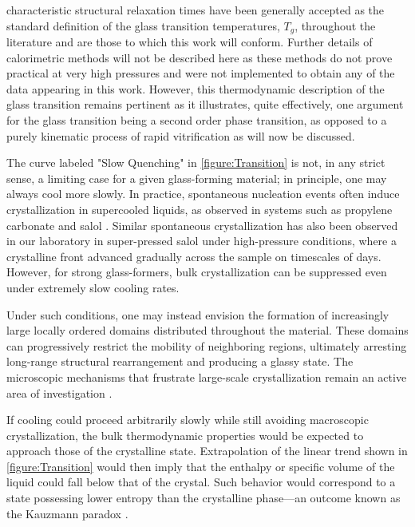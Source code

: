 characteristic structural relaxation times have been generally accepted as the standard definition of the glass transition temperatures, $T_g$, throughout the literature and are those to which this work will conform.  Further details of calorimetric methods will not be  described here as these methods do not prove practical at very high pressures and were not implemented to obtain any of the data appearing in this work.  However, this thermodynamic description of the glass transition remains pertinent as it illustrates, quite effectively, one argument for the glass transition being a second order phase transition, as opposed to a purely kinematic process of rapid vitrification as will now be discussed.  

The curve labeled "Slow Quenching" in \fig \nolinebreak \ref{figure:Transition} is not, in any strict sense, a limiting case for a given glass-forming material; in principle, one may always cool more slowly. In practice, spontaneous nucleation events often induce crystallization in supercooled liquids, as observed in systems such as propylene carbonate and salol \nolinebreak \cite{Szklarz}. Similar spontaneous crystallization has also been observed in our laboratory in super-pressed salol under high-pressure conditions, where a crystalline front advanced gradually across the sample on timescales of days. However, for strong glass-formers, bulk crystallization can be suppressed even under extremely slow cooling rates.

Under such conditions, one may instead envision the formation of increasingly large locally ordered domains distributed throughout the material. These domains can progressively restrict the mobility of neighboring regions, ultimately arresting long-range structural rearrangement and producing a glassy state. The microscopic mechanisms that frustrate large-scale crystallization remain an active area of investigation \nolinebreak \cite{Shintani}.

If cooling could proceed arbitrarily slowly while still avoiding macroscopic crystallization, the bulk thermodynamic properties would be expected to approach those of the crystalline state. Extrapolation of the linear trend shown in \fig \nolinebreak \ref{figure:Transition} would then imply that the enthalpy or specific volume of the liquid could fall below that of the crystal. Such behavior would correspond to a state possessing lower entropy than the crystalline phase—an outcome known as the Kauzmann paradox \nolinebreak \cite{Kauzmann}. 

